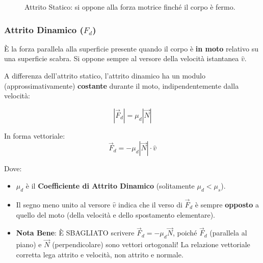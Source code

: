 \begin{figure}[h!]
    \centering
    \caption{Attrito Statico: si oppone alla forza motrice finché il corpo è fermo.}
\end{figure}

\subsubsection{Attrito Dinamico ($F_d$)}
È la forza parallela alla superficie presente quando il corpo è \textbf{in moto} relativo su una superficie scabra.
Si oppone sempre al versore della velocità istantanea $\hat{v}$.

A differenza dell'attrito statico, l'attrito dinamico ha un modulo (approssimativamente) \textbf{costante} durante il moto, indipendentemente dalla velocità:

\begin{equation}
    |\vec{F}_d| = \mu_d |\vec{N}|
\end{equation}

In forma vettoriale:
\begin{equation}
    \vec{F}_d = - \mu_d |\vec{N}| \cdot \hat{v}
\end{equation}

Dove:
\begin{itemize}
    \item $\mu_d$ è il \textbf{Coefficiente di Attrito Dinamico} (solitamente $\mu_d < \mu_s$).
    \item Il segno meno unito al versore $\hat{v}$ indica che il verso di $\vec{F}_d$ è sempre \textbf{opposto} a quello del moto (della velocità e dello spostamento elementare).
    \item \textbf{Nota Bene}: È SBAGLIATO scrivere $\vec{F}_d = -\mu_d \vec{N}$, poiché $\vec{F}_d$ (parallela al piano) e $\vec{N}$ (perpendicolare) sono vettori ortogonali! La relazione vettoriale corretta lega attrito e velocità, non attrito e normale.
\end{itemize}

